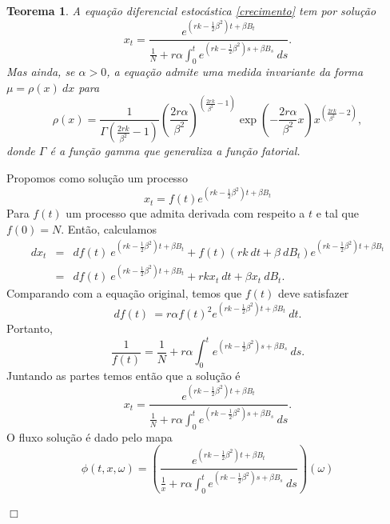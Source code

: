 \documentclass[12pt]{article}
\newtheorem{teo}{Teorema}%
\newenvironment{proof}{\noindent{\it Demonstra\c{c}\~ao.} }{\hfill $\Box$ \newline}
\begin{document}
\begin{teo} \label{teoprincipal}
A equação diferencial estocástica  \ref{crecimento}
tem por solução 
\[
x_t=\frac{e^{\left(rk-\frac{1}{2}\beta^2\right)t+\beta B_t}}{\frac{1}{N}+r\alpha\int_0^te^{\left(rk-\frac{1}{2}\beta^2\right)s+\beta B_s}~ds}.
\]
Mas ainda, se $\alpha>0$, a equação admite uma medida invariante da forma $\mu=\rho(x)~dx$ para 
\[
\rho(x)=
\frac{1}{\Gamma\left(\frac{2rk}{\beta^2}-1\right)}
\left(\frac{2r\alpha}{\beta^2}\right)^{\left(\frac{2rk}{\beta^2}-1\right)}\exp\left(-\frac{2r\alpha}{\beta^2}x\right)
x^{\left(\frac{2rk}{\beta^2}-2\right)},
\]
donde $\Gamma$ é a função gamma que generaliza a função fatorial.  

\end{teo}
\begin{proof}
Propomos como solução um processo
\[
x_t=f(t)e^{\left(rk-\frac{1}{2}\beta^2\right)t+\beta B_t}
\]
Para $f(t)$ um processo que admita derivada com respeito a $t$ e tal que $f(0)=N$. Então,  calculamos 
\begin{eqnarray*}
dx_t&=&df(t)~e^{\left(rk-\frac{1}{2}\beta^2\right)t+\beta B_t}+f(t)(rk~dt+\beta~dB_t)e^{\left(rk-\frac{1}{2}\beta^2\right)t+\beta B_t}\\
&=&df(t)~e^{\left(rk-\frac{1}{2}\beta^2\right)t+\beta B_t}+rkx_t~dt+\beta x_t~dB_t.
\end{eqnarray*}
Comparando com a equação original, temos que $f(t)$ deve satisfazer 
\[
df(t)~=r\alpha f(t)^2e^{\left(rk-\frac{1}{2}\beta^2\right)t+\beta B_t}~dt.
\]
Portanto, 
\[
\frac{1}{f(t)}=\frac{1}{N}+r\alpha\int_0^te^{\left(rk-\frac{1}{2}\beta^2\right)s+\beta B_s}~ds.
\]
Juntando as partes temos então que a solução é
\[
x_t=\frac{e^{\left(rk-\frac{1}{2}\beta^2\right)t+\beta B_t}}{\frac{1}{N}+r\alpha\int_0^te^{\left(rk-\frac{1}{2}\beta^2\right)s+\beta B_s}~ds}.
\]
O fluxo solução é dado pelo mapa 
\[
\phi(t,x,\omega)=\left(\frac{e^{\left(rk-\frac{1}{2}\beta^2\right)t+\beta B_t}}{\frac{1}{x}+r\alpha\int_0^te^{\left(rk-\frac{1}{2}\beta^2\right)s+\beta B_s}~ds}\right)(\omega)
\]


\end{proof}
\end{document}
